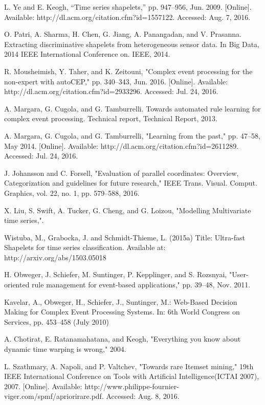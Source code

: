 \documentclass[conference]{IEEEtran}  %
\begin{document}
\begin{thebibliography}{9}

 L. Ye and E. Keogh, “Time series shapelets,” pp. 947–956, Jun. 2009. [Online]. Available: http://dl.acm.org/citation.cfm?id=1557122. Accessed: Aug. 7, 2016.

 O. Patri, A. Sharma, H. Chen, G. Jiang, A. Panangadan, and V. Prasanna. Extracting discriminative shapelets from heterogeneous sensor data. In Big Data, 2014 IEEE International Conference on. IEEE, 2014.

 R. Mousheimish, Y. Taher, and K. Zeitouni, "Complex event processing for the non-expert with autoCEP," pp. 340–343, Jun. 2016. [Online]. Available: http://dl.acm.org/citation.cfm?id=2933296. Accessed: Jul. 24, 2016.

 A. Margara, G. Cugola, and G. Tamburrelli. Towards automated rule learning for complex event processing. Technical report, Technical Report, 2013.

 A. Margara, G. Cugola, and G. Tamburrelli, "Learning from the past," pp. 47–58, May 2014. [Online]. Available: http://dl.acm.org/citation.cfm?id=2611289. Accessed: Jul. 24, 2016.

 J. Johansson and C. Forsell, "Evaluation of parallel coordinates: Overview, Categorization and guidelines for future research," IEEE Trans. Visual. Comput. Graphics, vol. 22, no. 1, pp. 579–588, 2016.

 X. Liu, S. Swift, A. Tucker, G. Cheng, and G. Loizou, "Modelling Multivariate time series,".
 
 Wistuba, M., Grabocka, J. and Schmidt-Thieme, L. (2015a) Title: Ultra-fast Shapelets for time series classification. Available at: http://arxiv.org/abs/1503.05018

 H. Obweger, J. Schiefer, M. Suntinger, P. Kepplinger, and S. Rozsnyai, "User-oriented rule management for event-based applications," pp. 39–48, Nov. 2011. 

 Kavelar, A., Obweger, H., Schiefer, J., Suntinger, M.: Web-Based Decision Making for Complex Event Processing Systems. In: 6th World Congress on Services, pp. 453–458 (July 2010)

 A. Chotirat, E. Ratanamahatana, and Keogh, "Everything you know about dynamic time warping is wrong," 2004.

 L. Szathmary, A. Napoli, and P. Valtchev, "Towards rare Itemset mining," 19th IEEE International Conference on Tools with Artificial Intelligence(ICTAI 2007), 2007. [Online]. Available: http://www.philippe-fournier-viger.com/spmf/apriorirare.pdf. Accessed: Aug. 8, 2016.


\end{thebibliography}
\end{document}
